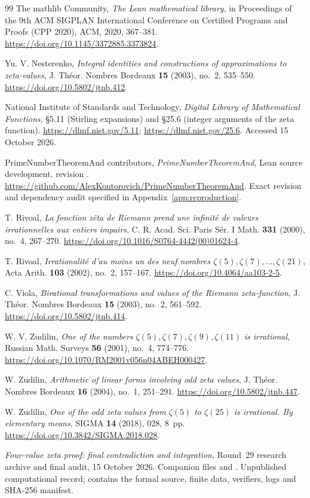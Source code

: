\begin{thebibliography}{99}
 The mathlib Community,
\emph{The Lean mathematical library},
in Proceedings of the 9th ACM SIGPLAN International Conference on Certified
Programs and Proofs (CPP 2020), ACM, 2020, 367--381.
\url{https://doi.org/10.1145/3372885.3373824}.

 Yu. V. Nesterenko,
\emph{Integral identities and constructions of approximations to zeta-values},
J. Th\'eor. Nombres Bordeaux \textbf{15} (2003), no.~2, 535--550.
\url{https://doi.org/10.5802/jtnb.412}.

 National Institute of Standards and Technology,
\emph{Digital Library of Mathematical Functions},
\S5.11 (Stirling expansions) and \S25.6 (integer arguments of the zeta function).
\url{https://dlmf.nist.gov/5.11}; \url{https://dlmf.nist.gov/25.6}.
Accessed 15 October 2026.

 PrimeNumberTheoremAnd contributors,
\emph{PrimeNumberTheoremAnd}, Lean source development,
revision .
\url{https://github.com/AlexKontorovich/PrimeNumberTheoremAnd}.
Exact revision and dependency audit specified in Appendix~\ref{app:reproduction}.

 T. Rivoal,
\emph{La fonction z\^eta de Riemann prend une infinit\'e de valeurs irrationnelles aux entiers impairs},
C. R. Acad. Sci. Paris S\'er. I Math. \textbf{331} (2000), no.~4, 267--270.
\url{https://doi.org/10.1016/S0764-4442(00)01624-4}.

 T. Rivoal,
\emph{Irrationalit\'e d'au moins un des neuf nombres $\zeta(5),\zeta(7),\ldots,\zeta(21)$},
Acta Arith. \textbf{103} (2002), no.~2, 157--167.
\url{https://doi.org/10.4064/aa103-2-5}.

 C. Viola,
\emph{Birational transformations and values of the Riemann zeta-function},
J. Th\'eor. Nombres Bordeaux \textbf{15} (2003), no.~2, 561--592.
\url{https://doi.org/10.5802/jtnb.414}.

 W. V. Zudilin,
\emph{One of the numbers $\zeta(5),\zeta(7),\zeta(9),\zeta(11)$ is irrational},
Russian Math. Surveys \textbf{56} (2001), no.~4, 774--776.
\url{https://doi.org/10.1070/RM2001v056n04ABEH000427}.

 W. Zudilin,
\emph{Arithmetic of linear forms involving odd zeta values},
J. Th\'eor. Nombres Bordeaux \textbf{16} (2004), no.~1, 251--291.
\url{https://doi.org/10.5802/jtnb.447}.

 W. Zudilin,
\emph{One of the odd zeta values from $\zeta(5)$ to $\zeta(25)$ is irrational.
By elementary means}, SIGMA \textbf{14} (2018), 028, 8~pp.
\url{https://doi.org/10.3842/SIGMA.2018.028}.

 \emph{Four-value zeta proof: final contradiction and integration},
Round~29 research archive and final audit, 15 October 2026.
Companion files  and
.
Unpublished computational record; contains the formal source, finite data,
verifiers, logs and SHA-256 manifest.
\end{thebibliography}
